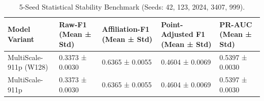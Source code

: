 \begin{table}
\caption{5-Seed Statistical Stability Benchmark (Seeds: 42, 123, 2024, 3407, 999).}
\begin{tabular}{lllll}
\toprule
Model Variant & Raw-F1 (Mean ± Std) & Affiliation-F1 (Mean ± Std) & Point-Adjusted F1 (Mean ± Std) & PR-AUC (Mean ± Std) \\
\midrule
MultiScale-911p (W128) & 0.3373 ± 0.0030 & 0.6365 ± 0.0055 & 0.4604 ± 0.0069 & 0.5397 ± 0.0030 \\
MultiScale-911p & 0.3373 ± 0.0030 & 0.6365 ± 0.0055 & 0.4604 ± 0.0069 & 0.5397 ± 0.0030 \\
\bottomrule
\end{tabular}
\end{table}
